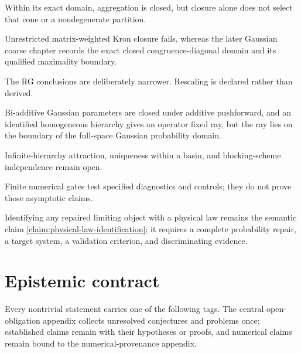 Within its exact domain, aggregation is closed, but closure alone does not
select that cone or a nondegenerate partition. 

Unrestricted matrix-weighted Kron closure fails, whereas
the later Gaussian coarse chapter records the exact closed
congruence-diagonal domain and its qualified maximality boundary.

The RG conclusions are deliberately narrower. Rescaling is declared rather
than derived. 

Bi-additive Gaussian parameters are closed under additive pushforward, and an
identified homogeneous hierarchy gives an operator fixed ray, but the ray lies
on the boundary of the full-space Gaussian probability domain. 

Infinite-hierarchy attraction, uniqueness within a basin, and blocking-scheme
independence remain open. 

Finite numerical gates test specified diagnostics and controls; they do not
prove those asymptotic claims. 

Identifying any repaired limiting object with a physical law remains the
semantic claim \ref{claim:physical-law-identification}; it requires a complete
probability repair, a target system, a validation criterion, and
discriminating evidence. 

\section*{Epistemic contract}

Every nontrivial statement carries one of the following tags. The central
open-obligation appendix collects unresolved conjectures and problems once;
established claims remain with their hypotheses or proofs, and numerical
claims remain bound to the numerical-provenance appendix.

